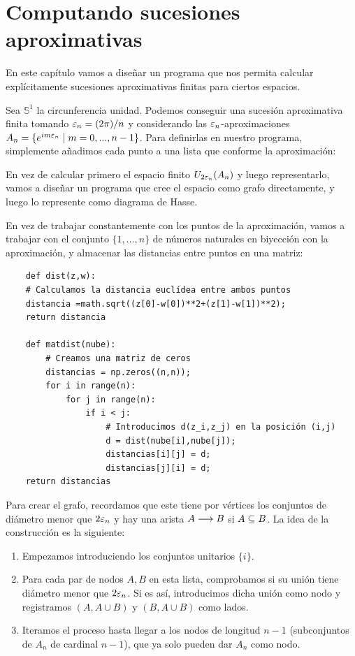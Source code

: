 \chapter{Computando sucesiones aproximativas}
En este capítulo vamos a dise\~nar un programa que nos permita calcular explícitamente sucesiones aproximativas finitas para ciertos espacios. 

Sea $ \mathbb{S}^1  $ la circunferencia unidad. Podemos conseguir una sucesión aproximativa finita tomando $ \varepsilon_n = (2\pi )/n$ y considerando las $ \varepsilon_n  $-aproximaciones $ A_n = \{e^{im \varepsilon_n }\mid m =0,...,n-1\} $. Para definirlas en nuestro programa, simplemente a\~nadimos cada punto a una lista que conforme la aproximación: 

En vez de calcular primero el espacio finito $ U_{2\varepsilon_n}(A_n) $ y luego representarlo, vamos a dise\~nar un programa que cree el espacio como grafo directamente, y luego lo represente como diagrama de Hasse. 

En vez de trabajar constantemente con los puntos de la aproximación, vamos a trabajar con el conjunto $ \{1,...,n\} $ de números naturales en biyección con la aproximación, y almacenar las distancias entre puntos en una matriz:
\begin{verbatim}
    def dist(z,w):
    # Calculamos la distancia euclídea entre ambos puntos
    distancia =math.sqrt((z[0]-w[0])**2+(z[1]-w[1])**2);
    return distancia

    def matdist(nube):
        # Creamos una matriz de ceros
        distancias = np.zeros((n,n));
        for i in range(n):
            for j in range(n):
                if i < j:
                    # Introducimos d(z_i,z_j) en la posición (i,j)
                    d = dist(nube[i],nube[j]);
                    distancias[i][j] = d;
                    distancias[j][i] = d;
    return distancias
\end{verbatim}

Para crear el grafo, recordamos que este tiene por vértices los conjuntos de diámetro menor que $ 2\varepsilon_n  $ y hay una arista $ A\longrightarrow B  $ si $ A\subseteq B  $. La idea de la construcción es la siguiente:
\begin{enumerate}
    \item Empezamos introduciendo los conjuntos unitarios $ \{i\} $.
    \item Para cada par de nodos $ A,B  $ en esta lista, comprobamos si su unión tiene diámetro menor que $ 2\varepsilon_n  $. Si es así, introducimos dicha unión como nodo y registramos $ (A,A\cup B ) $ y $ (B,A\cup B ) $ como lados.
    \item Iteramos el proceso hasta llegar a los nodos de longitud $ n-1 $ (subconjuntos de $ A_n  $ de cardinal $ n-1  $), que ya solo pueden dar $ A_n  $ como nodo.

\end{enumerate}

